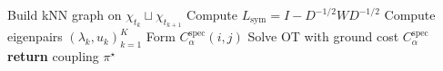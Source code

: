 \begin{algorithm}[t]
\caption{Spectral OT Coupling}
\label{alg:spectral_ot}
\begin{algorithmic}[1]
\STATE Build kNN graph on $\chi_{t_k}\sqcup\chi_{t_{k+1}}$
\STATE Compute $L_{\mathrm{sym}}=I-D^{-1/2}WD^{-1/2}$
\STATE Compute eigenpairs $(\lambda_k,u_k)_{k=1}^K$
\STATE Form $C_\alpha^{\mathrm{spec}}(i,j)$
\STATE Solve OT with ground cost $C_\alpha^{\mathrm{spec}}$
\STATE \textbf{return} coupling $\pi^\star$
\end{algorithmic}
\end{algorithm}



